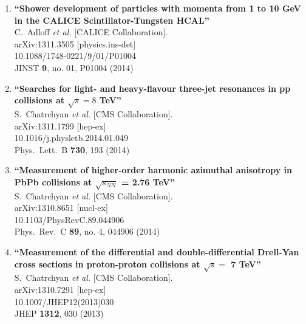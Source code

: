 \documentclass{article}
\begin{document}
\begin{enumerate}
\item%
{\bf ``Shower development of particles with momenta from 1 to 10 GeV in the CALICE Scintillator-Tungsten HCAL''}
  \\{}C.~Adloff {\it et al.}  [CALICE Collaboration].
  \\{}arXiv:1311.3505 [physics.ins-det]
    \\{}10.1088/1748-0221/9/01/P01004
\\{}JINST {\bf 9}, no. 01, P01004 (2014) %


\item%
{\bf ``Searches for light- and heavy-flavour three-jet resonances in pp collisions at $\sqrt{s} = 8$ TeV''}
  \\{}S.~Chatrchyan {\it et al.}  [CMS Collaboration].
  \\{}arXiv:1311.1799 [hep-ex]
    \\{}10.1016/j.physletb.2014.01.049
\\{}Phys.\ Lett.\ B {\bf 730}, 193 (2014) %


\item%
{\bf ``Measurement of higher-order harmonic azimuthal anisotropy in PbPb collisions at $\sqrt{s_{NN}}$ = 2.76 TeV''}
  \\{}S.~Chatrchyan {\it et al.}  [CMS Collaboration].
  \\{}arXiv:1310.8651 [nucl-ex]
    \\{}10.1103/PhysRevC.89.044906
\\{}Phys.\ Rev.\ C {\bf 89}, no. 4, 044906 (2014) %


\item%
{\bf ``Measurement of the differential and double-differential Drell-Yan cross sections in proton-proton collisions at $\sqrt{s} =$ 7 TeV''}
  \\{}S.~Chatrchyan {\it et al.}  [CMS Collaboration].
  \\{}arXiv:1310.7291 [hep-ex]
    \\{}10.1007/JHEP12(2013)030
\\{}JHEP {\bf 1312}, 030 (2013) %



\end{enumerate}
\end{document}
